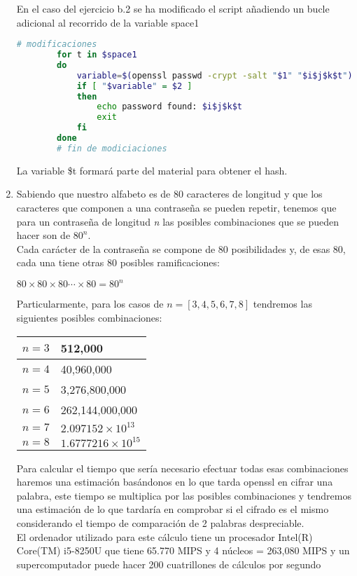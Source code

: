 \documentclass[10pt,a4paper]{article}
\begin{document}
\begin{enumerate}[label=\alph*]
En el caso del ejercicio b.2 se ha modificado el script añadiendo un bucle adicional al recorrido de la variable space1\\
\begin{lstlisting}[language=bash]
		# modificaciones
		for t in $space1
		do
			variable=$(openssl passwd -crypt -salt "$1" "$i$j$k$t")
			if [ "$variable" = $2 ]
			then
				echo password found: $i$j$k$t
				exit
			fi
		done
		# fin de modiciaciones
\end{lstlisting}
La variable \$t formará parte del material para obtener el hash.

\item Sabiendo que nuestro alfabeto es de 80 caracteres de longitud y que los caracteres que componen a una contraseña se pueden repetir, tenemos que para un contraseña de longitud \textit{n} las posibles combinaciones que se pueden hacer son de $ 80^{n} $. \\
Cada carácter de la contraseña se compone de 80 posibilidades y, de esas 80, cada una tiene otras 80 posibles ramificaciones:
\begin{center}
$ 80 \times 80 \times 80 \cdots \times 80 = 80^{n} $
\end{center}
Particularmente, para los casos de $ n = [3, 4, 5, 6, 7, 8] $ tendremos las siguientes posibles combinaciones:

\begin{center}
  \begin{tabular}{ | c | l | }
    \hline
     $ n = 3 $ & 512,000 \\ \hline
     $ n = 4 $ & 40,960,000 \\ \hline
     $ n = 5 $ & 3,276,800,000 \\ \hline
     $ n = 6 $ & 262,144,000,000 \\ \hline
     $ n = 7 $ & $2{.}097152\times10^{13}$ \\ \hline
     $ n = 8 $ & $1{.}6777216\times10^{15}$ \\
    \hline
  \end{tabular}
\end{center}

Para calcular el tiempo que sería necesario efectuar todas esas combinaciones haremos una estimación basándonos en lo que tarda openssl en cifrar una palabra, este tiempo se multiplica por las posibles combinaciones y tendremos una estimación de lo que tardaría en comprobar si el cifrado es el mismo considerando el tiempo de comparación de 2 palabras despreciable. \\
El ordenador utilizado para este cálculo tiene un procesador Intel(R) Core(TM) i5-8250U que tiene 65{.}770 MIPS \cite{i5} y 4 núcleos = 263,080 MIPS y un supercomputador puede hacer 200 cuatrillones de cálculos por segundo \cite{IBM}\\


\end{enumerate}
\end{document}
